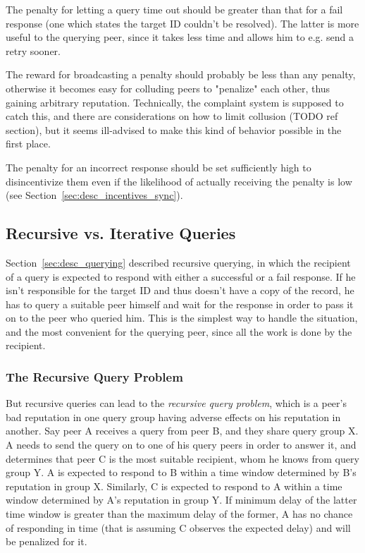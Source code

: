 The penalty for letting a query time out should be greater than that for a fail
response (one which states the target ID couldn't be resolved). The latter is
more useful to the querying peer, since it takes less time and allows him to
e.g. send a retry sooner.

The reward for broadcasting a penalty should probably be less than any penalty,
otherwise it becomes easy for colluding peers to "penalize" each other, thus
gaining arbitrary reputation. Technically, the complaint system is supposed to
catch this, and there are considerations on how to limit collusion (TODO ref
section), but it seems ill-advised to make this kind of behavior possible in the
first place.

The penalty for an incorrect response should be set sufficiently high to
disincentivize them even if the likelihood of actually receiving the penalty is
low (see Section~\ref{sec:desc_incentives_sync}).

\subsection{Recursive vs. Iterative Queries}
\label{sec:desc_recursive_vs_iterative}
Section~\ref{sec:desc_querying} described recursive querying, in which the
recipient of a query is expected to respond with either a successful or a fail
response. If he isn't responsible for the target ID and thus doesn't have a copy
of the record, he has to query a suitable peer himself and wait for the response
in order to pass it on to the peer who queried him. This is the simplest way to
handle the situation, and the most convenient for the querying peer, since all
the work is done by the recipient.

\subsubsection{The Recursive Query Problem}
\label{sec:desc_rec_query_prob}
But recursive queries can lead to the \emph{recursive query problem}, which is a
peer's bad reputation in one query group having adverse effects on his
reputation in another. Say peer A receives a query from peer B, and they share
query group X. A needs to send the query on to one of his query peers in order
to answer it, and determines that peer C is the most suitable recipient, whom he
knows from query group Y. A is expected to respond to B within a time window
determined by B's reputation in group X. Similarly, C is expected to respond to
A within a time window determined by A's reputation in group Y. If minimum delay
of the latter time window is greater than the maximum delay of the former, A has
no chance of responding in time (that is assuming C observes the expected
delay) and will be penalized for it.

